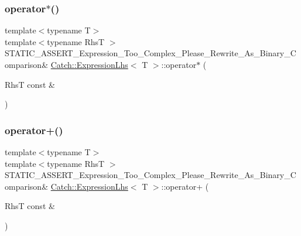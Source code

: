 \hypertarget{class_catch_1_1_expression_lhs_a9a94294c22449f62087862ef911e6291}{}\label{class_catch_1_1_expression_lhs_a9a94294c22449f62087862ef911e6291} 
\subsubsection{\texorpdfstring{operator$\ast$()}{operator*()}}
{\footnotesize\ttfamily template$<$typename T$>$ \\
template$<$typename RhsT $>$ \\
S\+T\+A\+T\+I\+C\+\_\+\+A\+S\+S\+E\+R\+T\+\_\+\+Expression\+\_\+\+Too\+\_\+\+Complex\+\_\+\+Please\+\_\+\+Rewrite\+\_\+\+As\+\_\+\+Binary\+\_\+\+Comparison\& \hyperlink{class_catch_1_1_expression_lhs}{Catch\+::\+Expression\+Lhs}$<$ T $>$\+::operator$\ast$ (\begin{DoxyParamCaption}\item[{RhsT const \&}]{ }\end{DoxyParamCaption})}

\hypertarget{class_catch_1_1_expression_lhs_a29ffb8417e977f0a98c0eb537a7ca5af}{}\label{class_catch_1_1_expression_lhs_a29ffb8417e977f0a98c0eb537a7ca5af} 
\subsubsection{\texorpdfstring{operator+()}{operator+()}}
{\footnotesize\ttfamily template$<$typename T$>$ \\
template$<$typename RhsT $>$ \\
S\+T\+A\+T\+I\+C\+\_\+\+A\+S\+S\+E\+R\+T\+\_\+\+Expression\+\_\+\+Too\+\_\+\+Complex\+\_\+\+Please\+\_\+\+Rewrite\+\_\+\+As\+\_\+\+Binary\+\_\+\+Comparison\& \hyperlink{class_catch_1_1_expression_lhs}{Catch\+::\+Expression\+Lhs}$<$ T $>$\+::operator+ (\begin{DoxyParamCaption}\item[{RhsT const \&}]{ }\end{DoxyParamCaption})}

\hypertarget{class_catch_1_1_expression_lhs_a19ef0a33442bb18efef1ec65102151d1}{}\label{class_catch_1_1_expression_lhs_a19ef0a33442bb18efef1ec65102151d1} 
